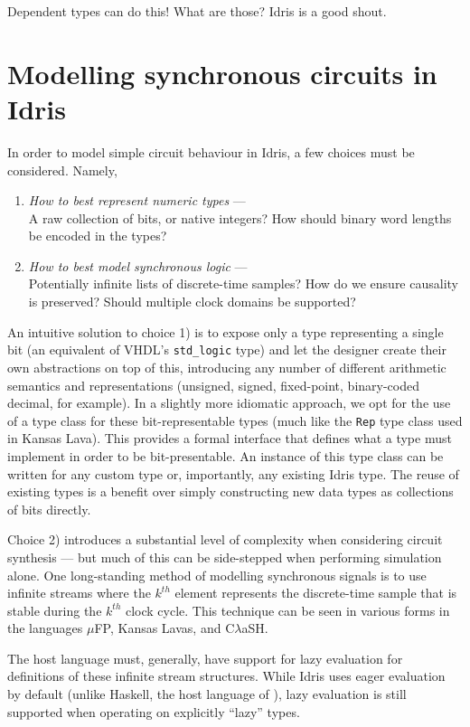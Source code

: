\documentclass[conference]{IEEEtran}
\begin{document}
Dependent types can do this! What are those? Idris is a good shout.

\section{Modelling synchronous circuits in Idris}

In order to model simple circuit behaviour in Idris, a few choices must be considered. Namely,
\begin{enumerate}
\item \emph{How to best represent numeric types} --- \\A raw collection of bits, or
  native integers? How should binary word lengths be encoded in the types?
\item \emph{How to best model synchronous logic} --- \\Potentially infinite lists of
  discrete-time samples? How do we ensure causality is preserved? Should
  multiple clock domains be supported?
\end{enumerate}

An intuitive solution to choice 1) is to expose only a type representing a
single bit (an equivalent of VHDL's \texttt{std\_logic} type) and let the
designer create their own abstractions on top of this, introducing any number of
different arithmetic semantics and representations (unsigned, signed,
fixed-point, binary-coded decimal, for example). In a slightly more idiomatic
approach, we opt for the use of a type class for these bit-representable types
(much like the \texttt{Rep} type class used in Kansas Lava\cite{gill_13}). This
provides a formal interface that defines what a type must implement in order to
be bit-presentable. An instance of this type class can be written for any
custom type or, importantly, any existing Idris type. The reuse of existing
types is a benefit over simply constructing new data types as collections of
bits directly.

Choice 2) introduces a substantial level of complexity when considering circuit
synthesis --- but much of this can be side-stepped when performing simulation
alone. One long-standing method of modelling synchronous signals is to use
infinite streams where the $k^{th}$ element represents the discrete-time sample
that is stable during the $k^{th}$ clock cycle. This technique can be seen in
various forms in the languages $\mu$FP\cite{ufp}, Kansas Lavas\cite{gill_09},
and C$\lambda$aSH\cite{baaij_15}.

The host language must, generally, have support for lazy evaluation for
definitions of these infinite stream structures. While Idris uses eager
evaluation by default (unlike Haskell, the host language of
\cite{gill_09,baaij_15}), lazy evaluation is still supported when operating on
explicitly ``lazy'' types.
\end{document}
